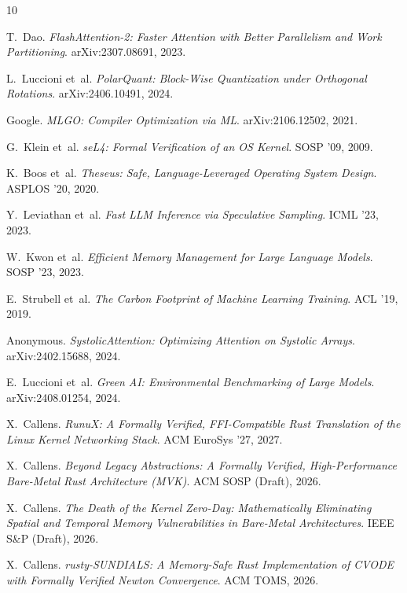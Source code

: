 \documentclass[sigconf,nonacm=false]{acmart}
\begin{document}

\begin{thebibliography}{10}

T.~Dao. \emph{FlashAttention-2: Faster Attention with Better Parallelism and Work Partitioning}. arXiv:2307.08691, 2023.

L.~Luccioni et~al. \emph{PolarQuant: Block-Wise Quantization under Orthogonal Rotations}. arXiv:2406.10491, 2024.

Google. \emph{MLGO: Compiler Optimization via ML}. arXiv:2106.12502, 2021.

G.~Klein et~al. \emph{seL4: Formal Verification of an OS Kernel}. SOSP '09, 2009.

K.~Boos et~al. \emph{Theseus: Safe, Language-Leveraged Operating System Design}. ASPLOS '20, 2020.

Y.~Leviathan et~al. \emph{Fast LLM Inference via Speculative Sampling}. ICML '23, 2023.

W.~Kwon et~al. \emph{Efficient Memory Management for Large Language Models}. SOSP '23, 2023.

E.~Strubell et~al. \emph{The Carbon Footprint of Machine Learning Training}. ACL '19, 2019.

Anonymous. \emph{SystolicAttention: Optimizing Attention on Systolic Arrays}. arXiv:2402.15688, 2024.

E.~Luccioni et~al. \emph{Green AI: Environmental Benchmarking of Large Models}. arXiv:2408.01254, 2024.

X.~Callens. \emph{RunuX: A Formally Verified, FFI-Compatible Rust Translation of the Linux Kernel Networking Stack}. ACM EuroSys '27, 2027.

X.~Callens. \emph{Beyond Legacy Abstractions: A Formally Verified, High-Performance Bare-Metal Rust Architecture (MVK)}. ACM SOSP (Draft), 2026.

X.~Callens. \emph{The Death of the Kernel Zero-Day: Mathematically Eliminating Spatial and Temporal Memory Vulnerabilities in Bare-Metal Architectures}. IEEE S\&P (Draft), 2026.

X.~Callens. \emph{rusty-SUNDIALS: A Memory-Safe Rust Implementation of CVODE with Formally Verified Newton Convergence}. ACM TOMS, 2026.

\end{thebibliography}
\end{document}
